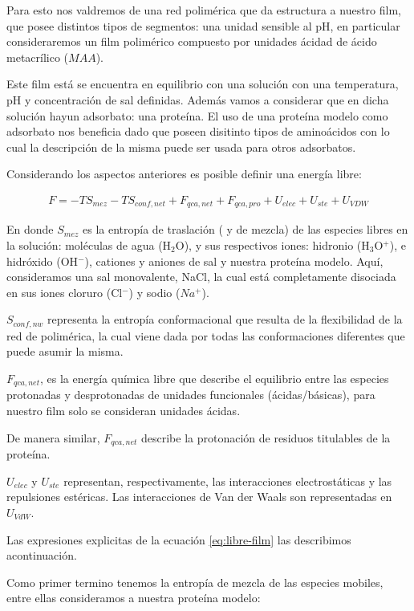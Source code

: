 Para esto nos valdremos de una  red polim\'erica que da estructura a nuestro film, que posee distintos tipos de segmentos: una unidad sensible al pH, en particular consideraremos un film polim\'erico compuesto por unidades \'acidad de \'acido metacr\'ilico ($MAA$).

Este film est\'a  se encuentra en equilibrio con una soluci\'on con una temperatura, pH y concentraci\'on de sal definidas. Adem\'as vamos a considerar que en dicha soluci\'on hayun adsorbato: una prote\'ina.
El uso de una prote\'ina modelo como adsorbato nos beneficia dado que poseen disitinto tipos de amino\'acidos con lo cual la descripci\'on de la misma puede ser usada para otros adsorbatos. 


Considerando los aspectos anteriores es posible definir una energ\'ia libre:

\begin{align}
 	F = -TS_{mez} -TS_{conf,net} + F_{qca,net} + F_{qca,pro} + U_{elec} + U_{ste} + U_{VDW}
 	\label{eq:libre-film}
\end{align}
 
\noindent En donde $S_{mez}$ es la entrop\'ia de traslaci\'on ( y de mezcla) de las especies libres en la soluci\'on: mol\'eculas de agua (H$_2$O), y sus respectivos iones:  hidronio (H$_3$O$^+$), e hidr\'oxido (OH$^- $), cationes y aniones de sal y nuestra prote\'ina modelo.
Aqu\'i, consideramos una sal monovalente, NaCl, la cual est\'a completamente disociada en sus  iones cloruro (Cl$^-$) y sodio ($Na^+$). 

$S_{conf,nw}$ representa la entrop\'ia conformacional que resulta de la flexibilidad de la red de polim\'erica, la cual viene dada por todas las conformaciones diferentes que puede asumir la misma.

$F_{qca,net}$, es la energ\'ia qu\'imica libre que describe el equilibrio entre las especies protonadas y desprotonadas de unidades funcionales (\'acidas/b\'asicas), para nuestro film solo se consideran unidades \'acidas.

De manera similar, $F_{qca,net}$ describe la protonaci\'on de residuos titulables de la prote\'ina.

$U_{elec}$ y $U_{ste}$ representan, respectivamente, las interacciones electrost\'aticas y las repulsiones est\'ericas.
Las interacciones de Van der Waals son representadas en $U_{VdW}$.


Las expresiones explicitas de la ecuaci\'on \ref{eq:libre-film} las describimos acontinuaci\'on.

Como primer termino tenemos la entrop\'ia de mezcla de  las especies mobiles, entre ellas consideramos a nuestra prote\'ina modelo:


